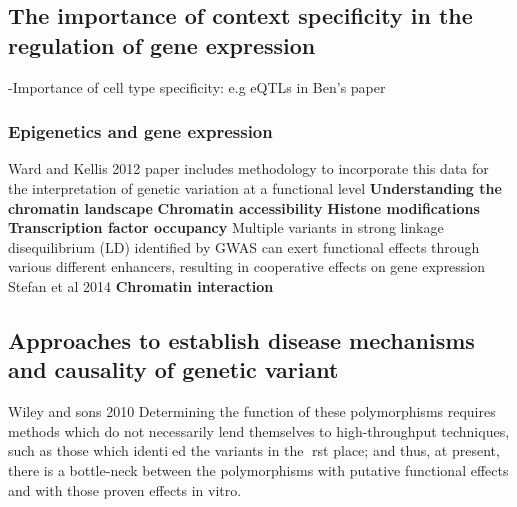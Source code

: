 \subsection{The importance of context specificity in the regulation of gene expression}
-Importance of cell type specificity: e.g eQTLs in Ben's paper
\subsubsection*{Epigenetics and gene expression}
Ward and Kellis 2012 paper includes methodology to incorporate this data for the interpretation of genetic variation at a functional level
\textbf{Understanding the chromatin landscape}
\textbf{Chromatin accessibility}
\textbf{Histone modifications}
\textbf{Transcription factor occupancy}
Multiple   variants   in   strong   linkage   disequilibrium   (LD)
 identified by GWAS can exert functional effects through
 various different enhancers, resulting in cooperative effects
 on gene expression  Stefan et al 2014
\textbf{Chromatin interaction}


\subsection{Approaches to establish disease mechanisms and causality of genetic variant}
Wiley and sons 2010
Determining the function of these polymorphisms requires methods which do not   necessarily   lend   themselves   to   high-throughput techniques, such as those which identied the variants in the rst place; and thus, at present, there is a bottle-neck between the polymorphisms with putative functional effects and with those proven effects in vitro.



